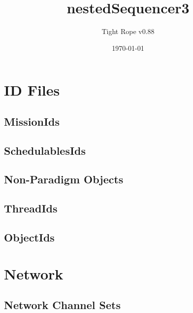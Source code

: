 \documentclass[10pt,a4paper]{article}
\title{nestedSequencer3}
\author{Tight Rope v0.88}
\date{\today}
\begin{document}
\maketitle

\section{ID Files}
\subsection{MissionIds}

\newpage

\subsection{SchedulablesIds}

\newpage

\subsection{Non-Paradigm Objects}
\newpage

\subsection{ThreadIds}

\newpage

\subsection{ObjectIds}

\newpage

\section{Network}
\subsection{Network Channel Sets}




{}
\end{document}
